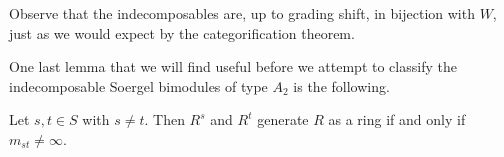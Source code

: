 \noindent\begin{remark} Observe that the indecomposables are, up to grading shift, in bijection with $W$, just as we would expect by the categorification theorem.\\
\end{remark}

\noindent One last lemma that we will find useful before we attempt to classify the indecomposable Soergel bimodules of type $A_2$ is the following.\\

\noindent\begin{lemma}\label{RSplitting2} Let $s, t \in S$ with $s \neq t$. Then $R^s$ and $R^t$ generate $R$ as a ring if and only if $m_{st} \neq \infty$.\\
\end{lemma}

